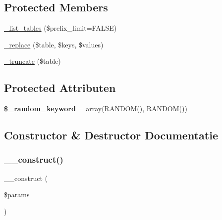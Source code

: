 \subsection*{Protected Members}
\begin{DoxyCompactItemize}
\item 
\mbox{\hyperlink{class_c_i___d_b__pdo__sqlite__driver_a435c0f3ce54fe7daa178baa8532ebd54}{\+\_\+list\+\_\+tables}} (\$prefix\+\_\+limit=F\+A\+L\+SE)
\item 
\mbox{\hyperlink{class_c_i___d_b__pdo__sqlite__driver_ae0adf73984daf2d42ad29b66c484c82b}{\+\_\+replace}} (\$table, \$keys, \$values)
\item 
\mbox{\hyperlink{class_c_i___d_b__pdo__sqlite__driver_aa029600528fc1ce660a23ff4b4667f95}{\+\_\+truncate}} (\$table)
\end{DoxyCompactItemize}
\subsection*{Protected Attributen}
\begin{DoxyCompactItemize}
\item 
\mbox{\label{class_c_i___d_b__pdo__sqlite__driver_a10213aa6e05f6d924d3277bb1d2fea00}} 
{\bfseries \$\+\_\+random\+\_\+keyword} = array(\textquotesingle{}R\+A\+N\+D\+OM()\textquotesingle{}, \textquotesingle{}R\+A\+N\+D\+OM()\textquotesingle{})
\end{DoxyCompactItemize}


\subsection{Constructor \& Destructor Documentatie}
\mbox{\label{class_c_i___d_b__pdo__sqlite__driver_a9162320adff1a1a4afd7f2372f753a3e}} 
\subsubsection{\texorpdfstring{\_\_construct()}{\_\_construct()}}
{\footnotesize\ttfamily \+\_\+\+\_\+construct (\begin{DoxyParamCaption}\item[{}]{\$params }\end{DoxyParamCaption})}

